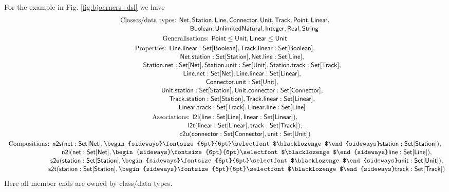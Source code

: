 \documentclass[10pt,fleqn,%
\ifpretendfinal
final%
\else
draft%
\fi,
]{scrreprt}
\newcommand{\composition}{\raisebox{0.2pt}{\begin{sideways}\fontsize{6pt}{6pt}\selectfont$\blacklozenge$\end{sideways}}}
\begin{document}
\medskip
For the example in Fig. \ref{fig:bjoerners_dsl} we have
%
\begin{gather*}
  \text{Classes/data types: }\mathsf{Net}, \mathsf{Station}, \mathsf{Line}, \mathsf{Connector}, \mathsf{Unit}, \mathsf{Track}, \mathsf{Point}, \mathsf{Linear},
\\[-.5ex]
  \phantom{\text{Classes/data types: }}\mathsf{Boolean}, \mathsf{UnlimitedNatural}, \mathsf{Integer}, \mathsf{Real}, \mathsf{String}
\\
  \text{Generalisations: }\mathsf{Point} \leq \mathsf{Unit}, \mathsf{Linear} \leq \mathsf{Unit}
\\
  \text{Properties: }\mathsf{Line.linear : Set[Boolean]}, \mathsf{Track.linear : Set[Boolean]},
\\[-.5ex]
  \phantom{\text{Properties: }}\mathsf{Net.station : Set[Station]}, \mathsf{Net.line : Set[Line]},
\\[-.5ex]
  \phantom{\text{Properties: }}\mathsf{Station.net : Set[Net]}, \mathsf{Station.unit : Set[Unit]}, \mathsf{Station.track : Set[Track]},
\\[-.5ex]
  \phantom{\text{Properties: }}\mathsf{Line.net : Set[Net]}, \mathsf{Line.linear : Set[Linear]},
\\[-.5ex]
  \phantom{\text{Properties: }}\mathsf{Connector.unit : Set[Unit]},
\\[-.5ex]
  \phantom{\text{Properties: }}\mathsf{Unit.station : Set[Station]}, \mathsf{Unit.connector : Set[Connector]},
\\[-.5ex]
  \phantom{\text{Properties: }}\mathsf{Track.station : Set[Station]}, \mathsf{Track.linear : Set[Linear]},
\\[-.5ex]
  \phantom{\text{Properties: }}\mathsf{Linear.track : Set[Track]}, \mathsf{Linear.line : Set[Line]}
\\
  \text{Associations: }\mathsf{l2l(line : Set[Line], linear : Set[Linear])},
\\[-.5ex]
  \phantom{\text{Associations: }}\mathsf{l2t(linear : Set[Linear], track : Set[Track])},
\\[-.5ex]
  \phantom{\text{Associations: }}\mathsf{c2u(connector : Set[Connector], unit : Set[Unit])}
\\
  \text{Compositions: }\mathsf{n2s(net : Set[Net], \composition station : Set[Station])},
\\[-.5ex]
  \phantom{\text{Compositions: }}\mathsf{n2l(net : Set[Net], \composition line : Set[Line])},
\\[-.5ex]
  \phantom{\text{Compositions: }}\mathsf{s2u(station : Set[Station], \composition unit : Set[Unit])},
\\[-.5ex]
  \phantom{\text{Compositions: }}\mathsf{s2t(station : Set[Station], \composition track : Set[Track])}
\end{gather*}
%
Here all member ends are owned by class/data types.
\end{document}
